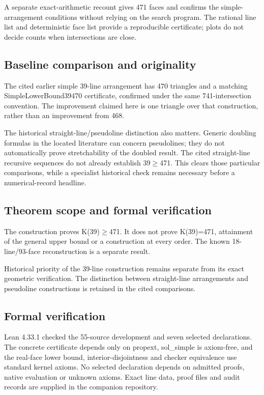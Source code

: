 \documentclass[11pt,a4paper]{article}
\begin{document}
A separate exact-arithmetic recount gives 471 faces and confirms the simple-arrangement conditions without relying on the search program. The rational line list and deterministic face list provide a reproducible certificate; plots do not decide counts when intersections are close.

\subsection{Baseline comparison and originality}
The cited earlier simple 39-line arrangement has 470 triangles and a matching SimpleLowerBound39470 certificate, confirmed under the same 741-intersection convention. The improvement claimed here is one triangle over that construction, rather than an improvement from 468.

The historical straight-line/pseudoline distinction also matters. Generic doubling formulas in the located literature can concern pseudolines; they do not automatically prove stretchability of the doubled result. The cited straight-line recursive sequences do not already establish 39\ensuremath{\geq}471. This clears those particular comparisons, while a specialist historical check remains necessary before a numerical-record headline.

\subsection{Theorem scope and formal verification}
The construction proves K(39)\ensuremath{\geq}471. It does not prove K(39)=471, attainment of the general upper bound or a construction at every order. The known 18-line/93-face reconstruction is a separate result.

Historical priority of the 39-line construction remains separate from its exact geometric verification. The distinction between straight-line arrangements and pseudoline constructions is retained in the cited comparisons.

\subsection{Formal verification}
Lean 4.33.1 checked the 55-source development and seven selected declarations. The concrete certificate depends only on propext, sol\_simple is axiom-free, and the real-face lower bound, interior-disjointness and checker equivalence use standard kernel axioms. No selected declaration depends on admitted proofs, native evaluation or unknown axioms. Exact line data, proof files and audit records are supplied in the companion repository.
\end{document}
